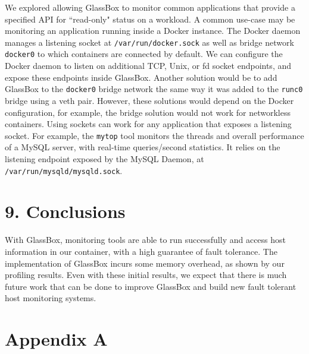 \documentclass{proc}
\begin{document}
We explored allowing GlassBox to monitor common applications that provide a specified API for ``read-only" status on a workload. A common use-case may be monitoring an application running inside a Docker instance. The Docker daemon manages a listening socket at \texttt{/var/run/docker.sock} as well as bridge network \texttt{docker0} to which containers are connected by default. We can configure the Docker daemon to listen on additional TCP, Unix, or fd socket endpoints, and expose these endpoints inside GlassBox. Another solution would be to add GlassBox to the \texttt{docker0} bridge network the same way it was added to the \texttt{runc0} bridge using a veth pair. However, these solutions would depend on the Docker configuration, for example, the bridge solution would not work for networkless containers. Using sockets can work for any application that exposes a listening socket. For example, the \texttt{mytop} tool monitors the threads and overall performance of a MySQL server, with real-time queries/second statistics. It relies on the listening endpoint exposed by the MySQL Daemon, at \texttt{/var/run/mysqld/mysqld.sock}.

\section*{9. Conclusions}

With GlassBox, monitoring tools are able to run successfully and access host information in our container, with a high guarantee of fault tolerance. The implementation of GlassBox incurs some memory overhead, as shown by our profiling results. Even with these initial results, we expect that there is much future work that can be done to improve GlassBox and build new fault tolerant host monitoring systems.




\clearpage

\section*{Appendix A}

\clearpage
\end{document}
